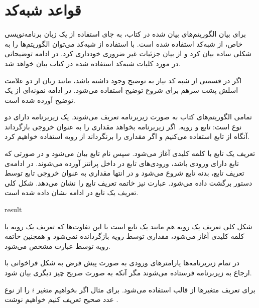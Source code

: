 \section*{قواعد شبه‌کد}

برای بیان الگوریتم‌های بیان شده در کتاب، به جای استفاده از یک زبان برنامه‌نویسی خاص، از شبه‌کد استفاده شده است. با استفاده از شبه‌کد می‌توان الگوریتم‌ها را به شکلی ساده بیان کرد و از بیان جزئیات غیر ضروری خودداری کرد. در ادامه توضیحاتی در مورد کلیات شبه‌کد استفاده شده در کتاب بیان خواهد شد.

اگر در قسمتی از شبه کد نیاز به توضیح وجود داشته باشد، مانند زبان {} از دو علامت اسلش پشت سرهم برای شروع توضیح استفاده می‌شود. در ادامه نمونه‌ای از یک توضیح آورده شده است.
\begin{latin}
\end{latin}

تمامی الگوریتم‌های کتاب به صورت زیربرنامه تعریف می‌شوند. یک زیربرنامه دارای دو نوع است: تابع و رویه. اگر زیربرنامه بخواهد مقداری را به عنوان خروجی بازگرداند آنگاه از تابع استفاده می‌کنیم و اگر مقداری را برنگرداند از رویه استفاده خواهیم کرد. 

تعریف یک تابع با کلمه کلیدی {} آغاز می‌شود. سپس نام تابع بیان می‌شود و در صورتی که تابع دارای ورودی باشد، ورودی‌های تابع در داخل پرانتز آورده می‌شوند. در ادامه‌ی تعریف تابع، بدنه تابع شروع می‌شود و در انتها مقداری به عنوان خروجی تابع توسط دستور {} برگشت داده می‌شود. عبارت {} نیز خاتمه تعریف تابع را نشان می‌دهد. شکل کلی تعریف یک تابع در ادامه نشان داده شده است.
\begin{latin}
\begin{algorithmic}[1]
	\State	{}
	\State	\Return result
\EndFunction
\end{algorithmic}
\end{latin}
شکل کلی تعریف یک رویه هم مانند یک تابع است با این تفاوت‌ها که تعریف یک رویه با کلمه کلیدی {} آغاز می‌شود، مقداری توسط رویه بازگردانده نمی‌شود و همچنین خاتمه رویه توسط عبارت {} مشخص می‌شود.

در تمام زیربرنامه‌ها پارامترهای ورودی به صورت پیش فرض به شکل فراخوانی با ارجاع به زیربرنامه فرستاده می‌شوند مگر آنکه به صورت صریح چیز دیگری بیان شود.

برای تعریف متغیرها از قالب {} استفاده می‌شود. برای مثال اگر بخواهیم متغیر {$i$} را از نوع عدد صحیح تعریف کنیم خواهیم نوشت {}.

